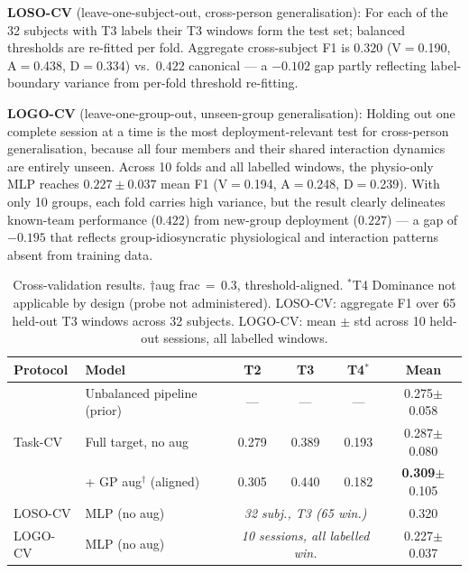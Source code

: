 \documentclass[sigconf,nonacm]{acmart}
\begin{document}
\textbf{LOSO-CV} (leave-one-subject-out, cross-person generalisation):
For each of the 32 subjects with T3 labels their T3 windows form the test
set; balanced thresholds are re-fitted per fold.
Aggregate cross-subject F1 is $0.320$ (V$=$0.190, A$=$0.438, D$=$0.334)
vs.\ $0.422$ canonical --- a $-0.102$ gap partly reflecting label-boundary
variance from per-fold threshold re-fitting.

\textbf{LOGO-CV} (leave-one-group-out, unseen-group generalisation):
Holding out one complete session at a time is the most deployment-relevant
test for cross-person generalisation, because all four members and their
shared interaction dynamics are entirely unseen.
Across 10 folds and all labelled windows, the physio-only MLP reaches
$0.227 \pm 0.037$ mean F1 (V$=$0.194, A$=$0.248, D$=$0.239).
With only 10 groups, each fold carries high variance, but the result
clearly delineates known-team performance ($0.422$) from new-group
deployment ($0.227$) --- a gap of $-0.195$ that reflects
group-idiosyncratic physiological and interaction patterns absent from
training data.

\begin{table}[t]
\caption{Cross-validation results. $\dagger$aug frac\,$=$\,0.3, threshold-aligned.
$^*$T4 Dominance not applicable by design (probe not administered).
LOSO-CV: aggregate F1 over 65 held-out T3 windows across 32 subjects.
LOGO-CV: mean $\pm$ std across 10 held-out sessions, all labelled windows.}
\label{tab:cv}
\centering
\setlength{\tabcolsep}{7pt}
\small
\begin{tabular}{llcccc}
\toprule
\textbf{Protocol} & \textbf{Model} &
  \textbf{T2} & \textbf{T3} & \textbf{T4}$^*$ & \textbf{Mean} \\
\midrule
\multirow{3}{*}{Task-CV}
  & Unbalanced pipeline (prior) & --- & --- & --- & 0.275$\pm$0.058 \\
  & Full target, no aug    & 0.279 & 0.389 & 0.193 & 0.287$\pm$0.080 \\
  & + GP aug$^\dagger$ (aligned) & 0.305 & 0.440 & 0.182 & \textbf{0.309}$\pm$0.105 \\
\midrule
LOSO-CV & MLP (no aug) & \multicolumn{3}{c}{\small\textit{32 subj., T3 (65 win.)}}
                                                & 0.320 \\
LOGO-CV & MLP (no aug) & \multicolumn{3}{c}{\small\textit{10 sessions, all labelled win.}}
                                                & 0.227$\pm$0.037 \\
\bottomrule
\end{tabular}
\end{table}
\end{document}
